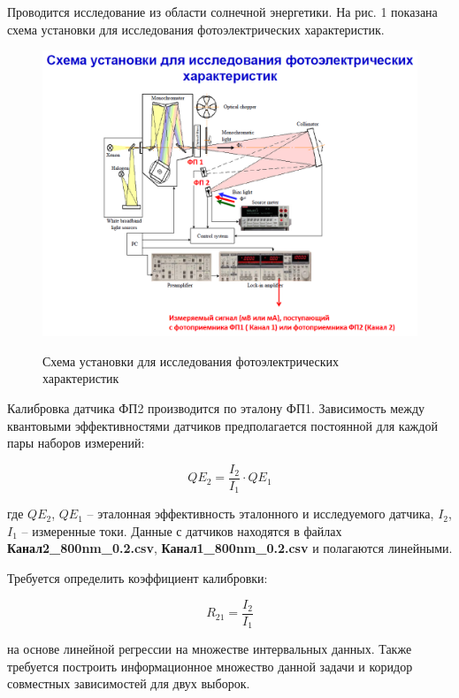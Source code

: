 Проводится исследование из области солнечной энергетики. На рис. 1 показана схема установки для исследования фотоэлектрических характеристик.

\begin{figure}[H]
	\begin{center}
		\includegraphics[scale=0.8]{problem1}
		\label{pic:problem1}
		\caption{Схема установки для исследования фотоэлектрических характеристик}
	\end{center}
\end{figure}

Калибровка датчика ФП2 производится по эталону ФП1. Зависимость между квантовыми эффективностями датчиков предполагается постоянной для каждой пары наборов измерений:

\begin{equation}
	QE_2 = \frac{I_2}{I_1} \cdot QE_1
\end{equation}

где $QE_2$, $QE_1$ -- эталонная эффективность эталонного и исследуемого датчика, $I_2$, $I_1$ -- измеренные токи. Данные с датчиков находятся в файлах \textbf{Канал2\_800nm\_0.2.csv}, \textbf{Канал1\_800nm\_0.2.csv} и полагаются линейными.

Требуется определить коэффициент калибровки:

\begin{equation}
R_{21} = \frac{I_2}{I_1}
\end{equation}

на основе линейной регрессии на множестве интервальных данных. Также требуется построить информационное множество данной задачи и коридор совместных зависимостей для двух выборок.